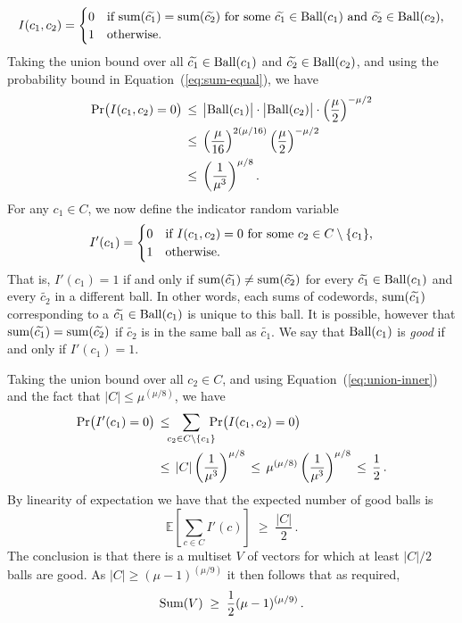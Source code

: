 \documentclass{toc}
\newcommand{\Prob}{\ensuremath{\textup{Pr}}}
\newcommand{\ball}[1]{\ensuremath{\textup{Ball}(#1)}}
\newcommand{\Vsum}{\ensuremath{\textup{Sum}}}
\newcommand{\vsum}{\ensuremath{\textup{sum}}}
\newcommand{\cbigI}{\ensuremath{\widetilde{c_1}}}
\newcommand{\cbigII}{\ensuremath{\widetilde{c_2}}}
\newcommand{\ELL}{\ensuremath{\mu}}
\newcommand{\expect}[1]{\mathbb{E}\left[{#1}\right]}
\begin{document}
%
\begin{equation*}
I(c_1,c_2) =
\begin{cases}
0 & \textup{if $\vsum(\cbigI)=\vsum(\cbigII)$ for some $\cbigI\in\ball{c_1}$ and  $\cbigII\in\ball{c_2}$,}\\
1 & \textup{otherwise.}
\end{cases}
\end{equation*}
%
Taking the union bound over all $\cbigI\in\ball{c_1}$ and
$\cbigII\in\ball{c_2}$, and using the probability bound in Equation~(\ref{eq:sum-equal}), we have
%
\begin{align}
\label{eq:union-inner}
\Prob \big( I(c_1, c_2) = 0 \big)
\, &\leq \, \big|\ball{c_1}\big|\cdot \big|\ball{c_2}\big| \cdot \left(\frac{\ELL}{2}\right)^{-\ELL/2}  \\
\, &\leq \, \left(\frac{\ELL}{16}\right)^{2(\ELL/16)} \left(\frac{\ELL}{2}\right)^{-\ELL/2} \notag \\
&\leq \, \left(\frac{1}{\ELL^3}\right)^{\ELL/8}. \notag
\end{align}
%
For any $c_1\in C$, we now define the indicator random variable
%
\begin{equation*}
I'(c_1) =
\begin{cases}
0 & \textup{if $I(c_1,c_2)=0$ for some $c_2\in C\setminus \{c_1\}$,}\\
1 & \textup{otherwise.}
\end{cases}
\end{equation*}
%
That is, $I'(c_1)=1$ if and only if
$\vsum(\cbigI)\neq\vsum(\cbigII)$
for every $\cbigI\in\ball{c_1}$ and every $\cbigII$ in a different ball. In other words, each sums of codewords, $\vsum(\cbigI)$ corresponding to a $\cbigI \in \ball{c_1}$ is unique to this ball. It is possible, however that $\vsum(\cbigI)=\vsum(\cbigII)$ if $\cbigII$ is in the same ball as $\cbigI$. We say that $\ball{c_1}$ is \emph{good} if and only if $I'(c_1)=1$.

Taking the union bound over all $c_2\in C$, and using Equation~(\ref{eq:union-inner}) and the fact that $|C|\leq \ELL^{(\ELL/8)}$, we have
%
\begin{align*}
%
\Prob \big( I'(c_1) = 0 \big) \, &\leq \!\!\! \sum_{c_2 \in C\setminus \{c_1\}} \!\!\!\! \Prob \big( I(c_1, c_2) = 0 \big)\\
\, &\leq \, |C| \left(\frac{1}{\ELL^3}\right)^{\ELL/8}
\, \leq \, \ELL^{(\ELL/8)} \left(\frac{1}{\ELL^3}\right)^{\ELL/8}
\, \leq \, \frac{1}{2} \,. \notag
\end{align*}
%
By linearity of expectation we have that the expected number of good balls is
\[
\expect{\sum_{c\in C}I'(c)} \;\geq\; \frac{|C|}2\,.
\]
The conclusion is that there is a multiset $V$ of vectors for
which at least $|C|/2$ balls are good. As  $|C|\geq (\ELL-1)^{(\ELL/9)}$ it then follows that as required,
\[
\Vsum(V) \;\geq\; \frac12 (\ELL-1)^{(\ELL/9)}\,.
\]
\end{document}
